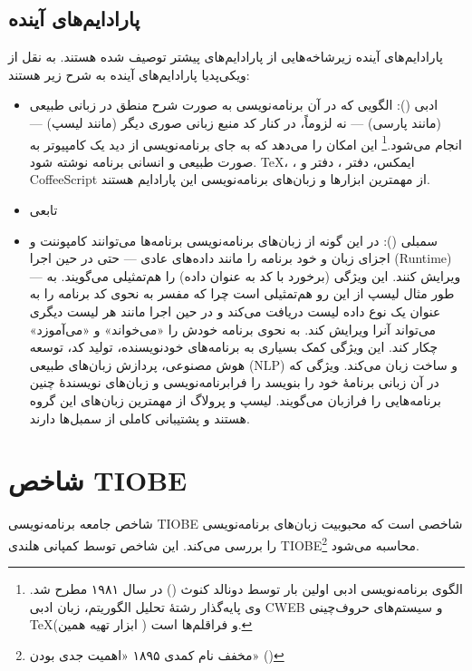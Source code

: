 \documentclass[a4paper]{article}
\begin{document}
\subsection{پارادایم‌های آینده}
پارادایم‌های آینده زیرشاخه‌هایی از پارادایم‌های پیشتر توصیف شده هستند.
به نقل از ویکی‌پدیا\cite{wp:paradigm} پارادایم‌های آینده به شرح زیر هستند:
\begin{itemize}
  \item ادبی (): الگویی که در آن برنامه‌نویسی به صورت شرح منطق در زبانی طبیعی (مانند پارسی) --- نه لزوماً، در کنار کد منبع زبانی صوری دیگر (مانند لیسپ) --- انجام می‌شود.\footnote{الگوی برنامه‌نویسی ادبی اولین بار توسط دونالد کنوث () در سال ۱۹۸۱ مطرح شد. وی پایه‌گذار رشتهٔ تحلیل الگوریتم، زبان ادبی CWEB و سیستم‌های حروف‌چینی \TeX (ابزار تهیه همین ) و فراقلم‌ها است.} این امکان را می‌دهد که به جای برنامه‌نویسی از دید یک کامپیوتر به صورت طبیعی و انسانی برنامه نوشته شود.
  \TeX، ،  ایمکس، دفتر ، دفتر  و CoffeeScript از مهمترین ابزارها و زبان‌های برنامه‌نویسی این پارادایم هستند.
  \item تابعی
  \item سمبلی (): در این گونه از زبان‌های برنامه‌نویسی برنامه‌ها می‌توانند
    کامپوننت و اجزای زبان و خود برنامه را مانند داده‌های عادی --- حتی در حین اجرا (Runtime) --- ویرایش کنند.
    این ویژگی (برخورد با کد به عنوان داده) را هم‌تمثیلی می‌گویند. به طور مثال لیسپ از این رو هم‌تمثیلی است چرا که مفسر به نحوی کد برنامه را به عنوان یک نوع داده لیست دریافت می‌کند و در حین اجرا مانند هر لیست دیگری می‌تواند آنرا ویرایش کند. به نحوی برنامه خودش را «می‌خواند» و «می‌آموزد» چکار کند.
    این ویژگی کمک بسیاری به برنامه‌های خودنویسنده، تولید کد، توسعه هوش مصنوعی، پردازش زبان‌های طبیعی (NLP) و ساخت زبان می‌کند.
    ویژگی که در آن زبانی برنامهٔ خود را بنویسد را فرابرنامه‌نویسی و زبان‌های نویسندهٔ چنین برنامه‌هایی را فرازبان می‌گویند.
    لیسپ و پرولاگ از مهمترین زبان‌های این گروه هستند و پشتیبانی کاملی از سمبل‌ها دارند.
\end{itemize}

\section{شاخص TIOBE}
شاخص جامعه برنامه‌نویسی TIOBE شاخصی است که محبوبیت زبان‌های برنامه‌نویسی را بررسی می‌کند.
این شاخص توسط کمپانی هلندی TIOBE\footnote{مخفف نام کمدی ۱۸۹۵ «اهمیت جدی بودن» ()} محاسبه می‌شود.
\end{document}
